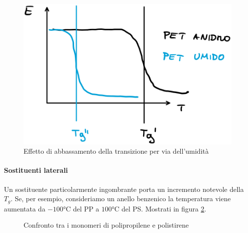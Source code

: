 \begin{figure}
\centering
\includegraphics[width = \textwidth]{gfx/Umidita}
\caption{Effetto di abbassamento della transizione per via dell'umidità}
\label{fig:Umidita}
\end{figure}

\paragraph{Sostituenti laterali}
Un sostituente particolarmente ingombrante porta un incremento notevole della $T_g$. Se, per esempio, consideriamo un anello benzenico la temperatura viene aumentata da $-100\unit{\celsius}$ del \ac{PP} a $100\unit{\celsius}$ del \ac{PS}. Mostrati in figura \ref{fig:ConfPPPS}.

\begin{figure}
\centering
{}\quad
{}
\caption{Confronto tra i monomeri di polipropilene e polistirene}
\label{fig:ConfPPPS}
\end{figure}

